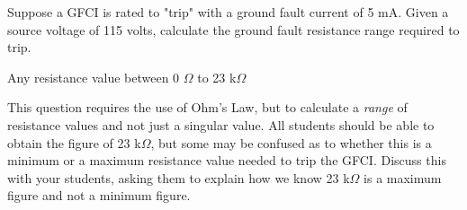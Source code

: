 

Suppose a GFCI is rated to "trip" with a ground fault current of 5 mA.  Given a source voltage of 115 volts, calculate the ground fault resistance range required to trip.







Any resistance value between 0 $\Omega$ to 23 k$\Omega$







This question requires the use of Ohm's Law, but to calculate a {\it range} of resistance values and not just a singular value.  All students should be able to obtain the figure of 23 k$\Omega$, but some may be confused as to whether this is a minimum or a maximum resistance value needed to trip the GFCI.  Discuss this with your students, asking them to explain how we know 23 k$\Omega$ is a maximum figure and not a minimum figure.



